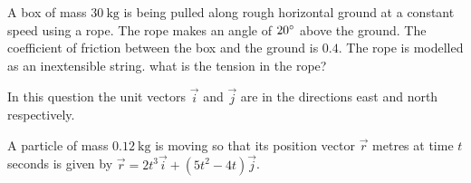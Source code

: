 \documentclass[
    style=OCRALevel,
    coverstyle=WellyOCR
]{examx}
\begin{document}
\begin{questions}
		\question[8][20]
		A box of mass $\qty{30}{\kg}$ is being pulled along rough 
		horizontal ground at a constant speed using a rope. The rope 
		makes an angle of $20\degree$ above the ground. The coefficient 
		of friction between the box and the ground is $0.4$. The rope 
		is modelled as an inextensible string. what is the tension in 
		the rope?
        
		
		\examnewpage
		\question
		In this question the unit vectors $\vec{i}$ and $\vec{j}$ are in the directions east and north respectively.
		
		\bigskip
		A particle of mass $\qty{0.12}{\kg}$ is moving so that its position vector $\vec{r}$ metres at time $t$ seconds is given by $\vec{r}=2t^3\vec{i}+(5t^2-4t)\vec{j}$.
\end{questions}
\end{document}
